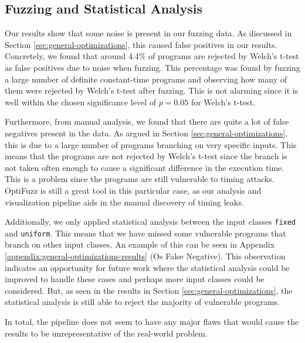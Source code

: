 \subsection{Fuzzing and Statistical Analysis}
Our results show that some noise is present in our fuzzing data.
As discussed in Section \ref{sec:general-optimizations}, this caused false positives in our results.
Concretely, we found that around 4.4\% of programs are rejected by Welch's t-test as false positives due to noise when fuzzing.
This percentage was found by fuzzing a large number of definite constant-time programs and observing how many of them were rejected by Welch's t-test after fuzzing.
This is not alarming since it is well within the chosen significance level of $p = 0.05$ for Welch's t-test.

Furthermore, from manual analysis, we found that there are quite a lot of false negatives present in the data.
As argued in Section \ref{sec:general-optimizations}, this is due to a large number of programs branching on very specific inputs.
This means that the programs are not rejected by Welch's t-test since the branch is not taken often enough to cause a significant difference in the execution time.
This is a problem since the programs are still vulnerable to timing attacks.
OptiFuzz is still a great tool in this particular case, as our analysis and visualization pipeline aids in the manual
discovery of timing leaks.

Additionally, we only applied statistical analysis between the input classes \texttt{fixed} and \texttt{uniform}.
This means that we have missed some vulnerable programs that branch on other input classes.
An example of this can be seen in Appendix \ref{appendix:general-optimizations-results} (Os False Negative).
This observation indicates an opportunity for future work where the statistical analysis could be improved to handle these cases and perhaps more input classes could be considered.
But, as seen in the results in Section \ref{sec:general-optimizations}, the statistical analysis is still able to reject the majority of vulnerable programs.

In total, the pipeline does not seem to have any major flaws that would cause the results to be unrepresentative of the real-world problem.
